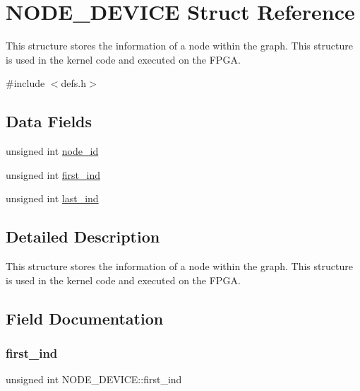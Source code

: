 \hypertarget{structNODE__DEVICE}{}\section{N\+O\+D\+E\+\_\+\+D\+E\+V\+I\+CE Struct Reference}
\label{structNODE__DEVICE}


This structure stores the information of a node within the graph. This structure is used in the kernel code and executed on the F\+P\+GA.  




{\ttfamily \#include $<$defs.\+h$>$}

\subsection*{Data Fields}
\begin{DoxyCompactItemize}
\item 
unsigned int \hyperlink{structNODE__DEVICE_ab0d37b3b13013ae6887a4fd809f7852e}{node\+\_\+id}
\item 
unsigned int \hyperlink{structNODE__DEVICE_af2adfd1f609392bfe1974b08b3080944}{first\+\_\+ind}
\item 
unsigned int \hyperlink{structNODE__DEVICE_aa13774c8a904d4696fd8e9c91fcc604c}{last\+\_\+ind}
\end{DoxyCompactItemize}


\subsection{Detailed Description}
This structure stores the information of a node within the graph. This structure is used in the kernel code and executed on the F\+P\+GA. 

\subsection{Field Documentation}
\mbox{\label{structNODE__DEVICE_af2adfd1f609392bfe1974b08b3080944}} 
\subsubsection{\texorpdfstring{first\+\_\+ind}{first\_ind}}
{\footnotesize\ttfamily unsigned int N\+O\+D\+E\+\_\+\+D\+E\+V\+I\+C\+E\+::first\+\_\+ind}


